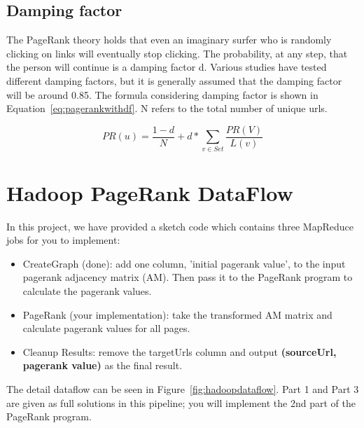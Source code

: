 \subsection*{Damping factor}
The PageRank theory holds that even an imaginary surfer who is randomly
clicking on links will eventually stop clicking. The probability, at any step,
that the person will continue is a damping factor d. Various studies have
tested different damping factors, but it is generally assumed that the damping
factor will be around 0.85. The formula considering damping factor is shown in
Equation~\ref{eq:pagerankwithdf}. N refers to the total number of unique urls. 

\begin{equation}\label{eq:pagerankwithdf}
PR(u) = \frac{1-d}{N} + d * \sum_{v \in Set} \frac{PR(V)}{L(v)}
\end{equation}

\section*{Hadoop PageRank DataFlow}
In this project, we have provided a sketch code which contains three MapReduce
jobs for you to implement:

\begin{itemize}
\item CreateGraph (done): add one column, 'initial pagerank value', to the
  input pagerank adjacency matrix (AM). Then pass it to the PageRank program to
    calculate the pagerank values. 
\item PageRank (your implementation): take the transformed AM matrix and
  calculate pagerank values for all pages. 
\item Cleanup Results: remove the targetUrls column and output
  \textbf{(sourceUrl, pagerank value)} as the final result. 
\end{itemize}

The detail dataflow can be seen in Figure~\ref{fig:hadoopdataflow}. Part 1 and
Part 3 are given as full solutions in this pipeline; you will implement the 2nd
part of the PageRank program.


